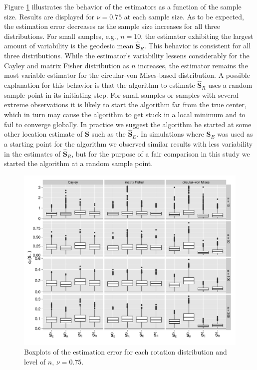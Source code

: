 \documentclass[12pt]{article}
\newcommand{\ProjMean}{{\widehat{\bm S}_E}}
\newcommand{\GeomMean}{{\widehat{\bm S}_R}}
\begin{document}
Figure \ref{fig:NBoxes} illustrates the behavior of the estimators as a function of the sample size. Results are displayed for  $\nu=0.75$ at each sample size. As to be expected, the estimation error decreases as the sample size increases for all three distributions. For small samples, e.g., $n=10$, the estimator exhibiting the largest amount of variability is the geodesic mean $\GeomMean$. This behavior is consistent for all three distributions.  While the estimator's variability lessens considerably for the Cayley and matrix Fisher distribution as $n$ increases, the estimator remains the most variable estimator for the circular-von Mises-based distribution.  A possible explanation for this behavior is that the algorithm to estimate $\GeomMean$ uses a random sample point in its initiating step.  For small samples or samples with several extreme observations it is likely to start the algorithm far from the true center, which in turn may cause the algorithm to get stuck in a local minimum and to fail to converge globally.  In practice we suggest the algorithm be started at some other location estimate of $\bm S$ such as the $\ProjMean$. In simulations where $\ProjMean$ was used as a starting point for the algorithm we observed  similar results with less variability in the estimates of $\GeomMean$, but for the purpose of a fair comparison in this study we started the algorithm at a random sample point.


\begin{figure}[h!]
\centering
\includegraphics[width=1\textwidth]{Nu75AllNBoxes.pdf}
\caption{Boxplots of the estimation error for each rotation distribution and level of $n$,  $\nu=0.75$.}
\label{fig:NBoxes}
\end{figure}
\end{document}
